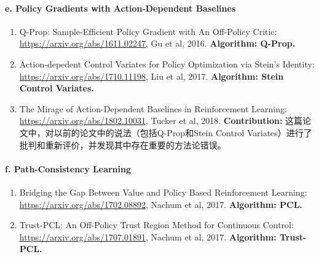 \documentclass[lang=cn,11pt,a4paper]{elegant_template}
\begin{document}
\paragraph{e. Policy Gradients with Action-Dependent Baselines}
\begin{enumerate}
    \item Q-Prop: Sample-Efficient Policy Gradient with An Off-Policy Critic:\\ \href{https://arxiv.org/abs/1611.02247}{https://arxiv.org/abs/1611.02247}, Gu et al, 2016. \textbf{Algorithm: Q-Prop.}
    \item Action-depedent Control Variates for Policy Optimization via Stein’s Identity:\\ \href{https://arxiv.org/abs/1710.11198}{https://arxiv.org/abs/1710.11198}, Liu et al, 2017. \textbf{Algorithm: Stein Control Variates.}
    \item The Mirage of Action-Dependent Baselines in Reinforcement Learning:\\ \href{https://arxiv.org/abs/1802.10031}{https://arxiv.org/abs/1802.10031}, Tucker et al, 2018. \textbf{Contribution:} 这篇论文中，对以前的论文中的说法（包括Q-Prop和Stein Control Variates）进行了批判和重新评价，并发现其中存在重要的方法论错误。
\end{enumerate}

\paragraph{f. Path-Consistency Learning}
\begin{enumerate}
    \item Bridging the Gap Between Value and Policy Based Reinforcement Learning:\\ \href{https://arxiv.org/abs/1702.08892}{https://arxiv.org/abs/1702.08892}, Nachum et al, 2017. \textbf{Algorithm: PCL.}
    \item Trust-PCL: An Off-Policy Trust Region Method for Continuous Control:\\ \href{https://arxiv.org/abs/1707.01891}{https://arxiv.org/abs/1707.01891}, Nachum et al, 2017. \textbf{Algorithm: Trust-PCL.}
\end{enumerate}
\end{document}
